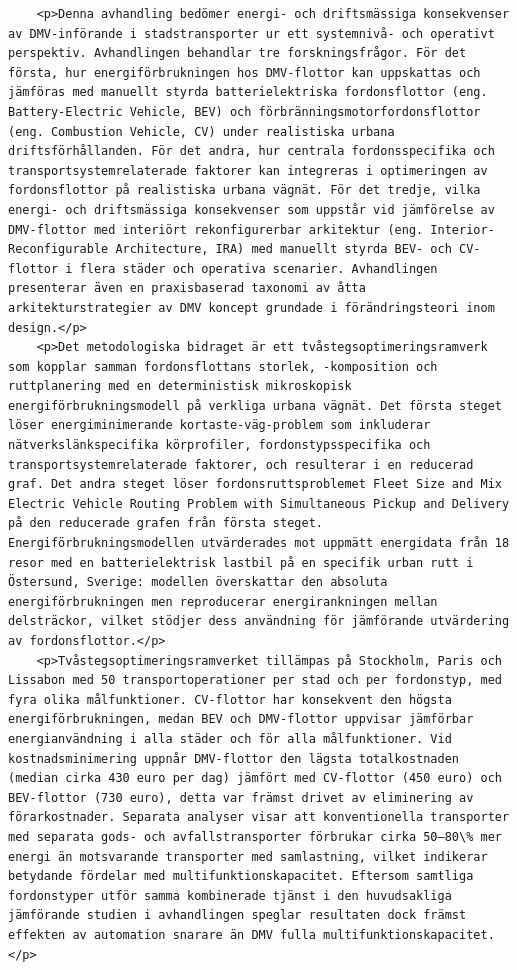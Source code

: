 \begin{casestudySection}
\begin{lstlisting}
    <p>Denna avhandling bedömer energi- och driftsmässiga konsekvenser av DMV-införande i stadstransporter ur ett systemnivå- och operativt perspektiv. Avhandlingen behandlar tre forskningsfrågor. För det första, hur energiförbrukningen hos DMV-flottor kan uppskattas och jämföras med manuellt styrda batterielektriska fordonsflottor (eng. Battery-Electric Vehicle, BEV) och förbränningsmotorfordonsflottor (eng. Combustion Vehicle, CV) under realistiska urbana driftsförhållanden. För det andra, hur centrala fordonsspecifika och transportsystemrelaterade faktorer kan integreras i optimeringen av fordonsflottor på realistiska urbana vägnät. För det tredje, vilka energi- och driftsmässiga konsekvenser som uppstår vid jämförelse av DMV-flottor med interiört rekonfigurerbar arkitektur (eng. Interior-Reconfigurable Architecture, IRA) med manuellt styrda BEV- och CV-flottor i flera städer och operativa scenarier. Avhandlingen presenterar även en praxisbaserad taxonomi av åtta arkitekturstrategier av DMV koncept grundade i förändringsteori inom design.</p>
    <p>Det metodologiska bidraget är ett tvåstegsoptimeringsramverk som kopplar samman fordonsflottans storlek, -komposition och ruttplanering med en deterministisk mikroskopisk energiförbrukningsmodell på verkliga urbana vägnät. Det första steget löser energiminimerande kortaste-väg-problem som inkluderar nätverkslänkspecifika körprofiler, fordonstypsspecifika och transportsystemrelaterade faktorer, och resulterar i en reducerad graf. Det andra steget löser fordonsruttsproblemet Fleet Size and Mix Electric Vehicle Routing Problem with Simultaneous Pickup and Delivery på den reducerade grafen från första steget. Energiförbrukningsmodellen utvärderades mot uppmätt energidata från 18 resor med en batterielektrisk lastbil på en specifik urban rutt i Östersund, Sverige: modellen överskattar den absoluta energiförbrukningen men reproducerar energirankningen mellan delsträckor, vilket stödjer dess användning för jämförande utvärdering av fordonsflottor.</p>
    <p>Tvåstegsoptimeringsramverket tillämpas på Stockholm, Paris och Lissabon med 50 transportoperationer per stad och per fordonstyp, med fyra olika målfunktioner. CV-flottor har konsekvent den högsta energiförbrukningen, medan BEV och DMV-flottor uppvisar jämförbar energianvändning i alla städer och för alla målfunktioner. Vid kostnadsminimering uppnår DMV-flottor den lägsta totalkostnaden (median cirka 430 euro per dag) jämfört med CV-flottor (450 euro) och BEV-flottor (730 euro), detta var främst drivet av eliminering av förarkostnader. Separata analyser visar att konventionella transporter med separata gods- och avfallstransporter förbrukar cirka 50–80\% mer energi än motsvarande transporter med samlastning, vilket indikerar betydande fördelar med multifunktionskapacitet. Eftersom samtliga fordonstyper utför samma kombinerade tjänst i den huvudsakliga jämförande studien i avhandlingen speglar resultaten dock främst effekten av automation snarare än DMV fulla multifunktionskapacitet.</p>

\end{lstlisting}
\end{casestudySection}
